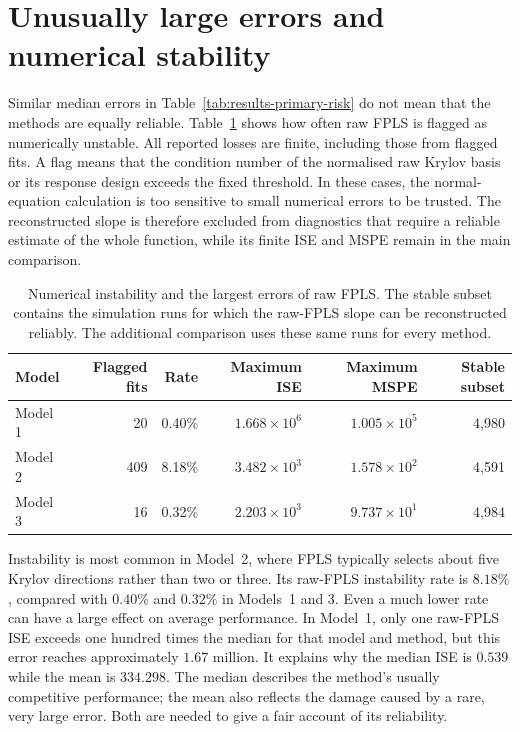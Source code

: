 \section{Unusually large errors and numerical stability}
\label{sec:results-numerical-stability}

Similar median errors in Table~\ref{tab:results-primary-risk} do not mean that
the methods are equally reliable.  Table~\ref{tab:results-raw-instability}
shows how often raw FPLS is flagged as numerically unstable.  All reported
losses are finite, including those from flagged fits.  A flag means that the
condition number of the normalised raw Krylov basis or its response design
exceeds the fixed threshold.  In these cases, the normal-equation calculation
is too sensitive to small numerical errors to be trusted.  The
reconstructed slope is therefore excluded from diagnostics that require a
reliable estimate of the whole function, while its finite ISE and MSPE remain
in the main comparison.

\begin{table}[htbp]
    \centering
    \small
    \caption[Raw-FPLS instability and unusually large errors]{Numerical instability and the largest errors of raw FPLS.
    The stable subset contains the simulation runs for which the raw-FPLS
    slope can be reconstructed reliably.  The additional comparison uses
    these same runs for every method.}
    \label{tab:results-raw-instability}
    \begin{tabular}{@{}lrrrrr@{}}
        \toprule
        Model & Flagged fits & Rate & Maximum ISE & Maximum MSPE
              & Stable subset \\
        \midrule
        Model 1 & 20  & 0.40\% & $1.668\times10^{6}$ & $1.005\times10^{5}$ & 4,980 \\
        Model 2 & 409 & 8.18\% & $3.482\times10^{3}$ & $1.578\times10^{2}$ & 4,591 \\
        Model 3 & 16  & 0.32\% & $2.203\times10^{3}$ & $9.737\times10^{1}$ & 4,984 \\
        \bottomrule
    \end{tabular}
\end{table}

Instability is most common in Model~2, where FPLS typically selects about
five Krylov directions rather than two or three.  Its raw-FPLS instability
rate is $8.18\%$, compared with $0.40\%$ and $0.32\%$ in Models~1 and 3.
Even a much lower rate can have a large effect on average performance.  In
Model~1, only one raw-FPLS ISE exceeds one hundred times the median for that
model and method, but this error reaches approximately $1.67$ million.  It
explains why the median ISE is $0.539$ while the mean is $334.298$.
The median describes the method's usually competitive performance; the mean
also reflects the damage caused by a rare, very large error.  Both are needed
to give a fair account of its reliability.

